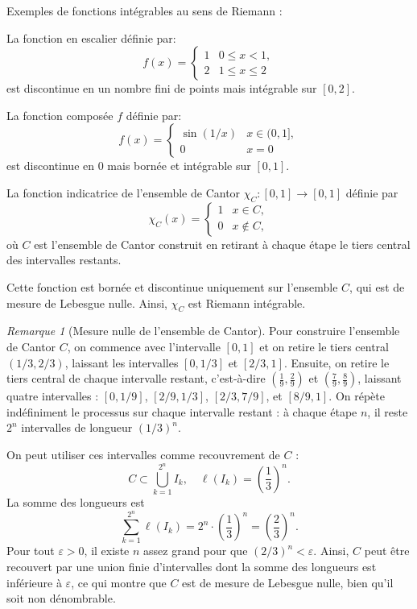 \documentclass{report} %
\theoremstyle{definition}  %
\theoremstyle{plain} %
\theoremstyle{remark} %
\newtheorem*{remark}{Remarque} %
\begin{document}
\medskip
\noindent
Exemples de fonctions intégrables au sens de Riemann :  

\medskip
La fonction en escalier définie par:
\[
f(x) =
\begin{cases}
1 & 0 \le x < 1,\\
2 & 1 \le x \le 2
\end{cases}
\]
est discontinue en un nombre fini de points mais intégrable sur \([0,2]\).

\medskip
La fonction composée \(f\) définie par:
\[
f(x) = \begin{cases} \sin(1/x) & x \in (0,1], \\ 0 & x = 0 \end{cases}
\]
est discontinue en \(0\) mais bornée et intégrable sur \([0,1]\).

\medskip
La fonction indicatrice de l’ensemble de Cantor 
\(\chi_C : [0,1] \to [0,1]\) définie par
\[
\chi_C(x) =
\begin{cases}
1 & x \in C, \\
0 & x \notin C,
\end{cases}
\]
où \(C\) est l’ensemble de Cantor construit en retirant à chaque étape le tiers central des intervalles restants.  

\noindent
Cette fonction est bornée et discontinue uniquement sur l’ensemble \(C\),  
qui est de mesure de Lebesgue nulle. Ainsi, \(\chi_C\) est Riemann intégrable.
\medskip
\begin{remark}[Mesure nulle de l'ensemble de Cantor]
Pour construire l'ensemble de Cantor \(C\), on commence avec l'intervalle \([0,1]\) 
et on retire le tiers central \((1/3, 2/3)\), laissant les intervalles \([0,1/3]\) et \([2/3,1]\).
Ensuite, on retire le tiers central de chaque intervalle restant, 
c'est-à-dire \((\frac{1}{9}, \frac{2}{9})\) et \((\frac{7}{9}, \frac{8}{9})\),
laissant quatre intervalles : \([0,1/9]\), \([2/9,1/3]\), \([2/3,7/9]\), et \([8/9,1]\).
On répète indéfiniment le processus sur chaque intervalle restant : à chaque étape \(n\), il reste \(2^n\) intervalles de longueur \((1/3)^n\).  

On peut utiliser ces intervalles comme recouvrement de \(C\) :
\[
C \subset \bigcup_{k=1}^{2^n} I_k, \quad \ell(I_k) = \left(\frac{1}{3}\right)^n.
\]
La somme des longueurs est
\[
\sum_{k=1}^{2^n} \ell(I_k) = 2^n \cdot \left(\frac{1}{3}\right)^n = \left(\frac{2}{3}\right)^n.
\]
Pour tout \(\varepsilon > 0\), il existe \(n\) assez grand pour que
\((2/3)^n < \varepsilon\). Ainsi, \(C\) peut être recouvert par une union finie
d’intervalles dont la somme des longueurs est inférieure à \(\varepsilon\),
ce qui montre que \(C\) est de mesure de Lebesgue nulle, bien qu’il soit non dénombrable.
\end{remark}
\end{document}
